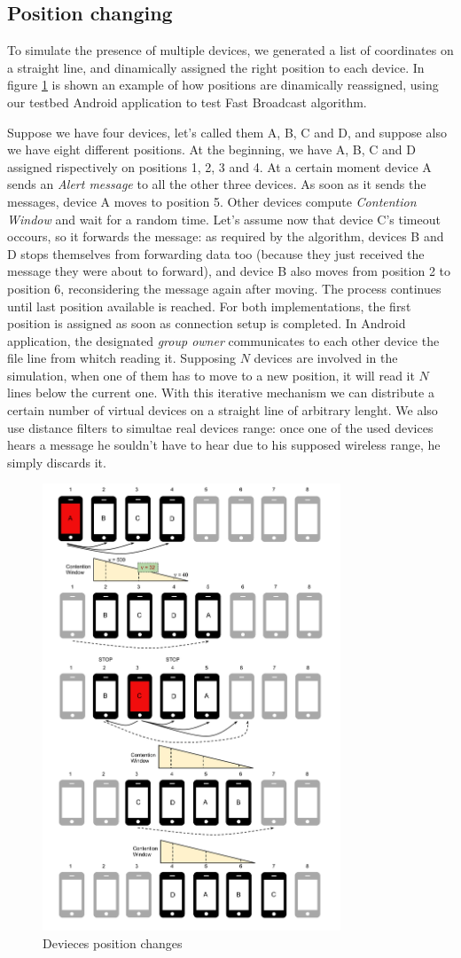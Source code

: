\subsection{Position changing}
\label{sec:position_change}

To simulate the presence of multiple devices, we generated a list of coordinates on a straight line, and dinamically assigned the right position to each device. In figure \ref{fig:positions} is shown an example of how positions are dinamically reassigned, using our testbed Android application to test Fast Broadcast algorithm.

Suppose we have four devices, let's called them A, B, C and D, and suppose also we have eight different positions. At the beginning, we have A, B, C and D assigned rispectively on positions 1, 2, 3 and 4. At a certain moment device A sends an \emph{Alert message} to all the other three devices. As soon as it sends the messages, device A moves to position 5. Other devices compute \textit{Contention Window} and wait for a random time. Let's assume now that device C's timeout occours, so it forwards the message: as required by the algorithm, devices B and D stops themselves from forwarding data too (because they just received the message they were about to forward), and device B also moves from position 2 to position 6, reconsidering the message again after moving. The process continues until last position available is reached.
For both implementations, the first position is assigned as soon as connection setup is completed. In Android application, the designated \textit{group owner} communicates to each other device the file line from whitch reading it. Supposing $N$ devices are involved in the simulation, when one of them has to move to a new position, it will read it $N$ lines below the current one.
With this iterative mechanism we can distribute a certain number of virtual devices on a straight line of arbitrary lenght. 
We also use distance filters to simultae real devices range: once one of the used devices hears a message he souldn't have to hear due to his supposed wireless range, he simply discards it.

\begin{figure}[htbp]
\centering
\includegraphics[trim = 10mm 15mm 10mm 10mm ,width=3.5in]{imgs/Positions_1.pdf}
\caption{Devieces position changes}
\label{fig:positions}
\end{figure}
